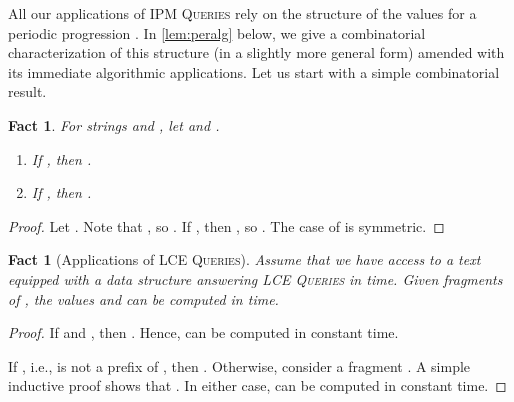 \documentclass[a4paper]{article}
\newtheorem{fact}[theorem]{Fact}
\theoremstyle{definition}
\theoremstyle{remark}
\newcommand{\IPM}{\textsc{IPM Queries}\xspace}
\newcommand{\LCEQ}{\textsc{LCE Queries}\xspace}
\begin{document}
All our applications of \IPM rely on the structure of the values  for a periodic progression .
In \cref{lem:peralg} below, we give a combinatorial characterization of this structure (in a slightly more general form) amended with its immediate algorithmic applications.
Let us start with a simple combinatorial result.
\begin{fact}\label{fct:lcp}
For strings  and , let  and .
\begin{enumerate}[label=(\alph*)]
  \item If , then .
  \item If , then .
\end{enumerate}
\end{fact}
\begin{proof}
Let . Note that , so .
If , then , so . The case of  is symmetric.
\end{proof}

\begin{fact}[Applications of \LCEQ]\label{fct:lce}
Assume that we have access to a text  equipped with a data structure answering \LCEQ in  time.
Given fragments  of , the values  and 
can be computed in  time.
\end{fact}
\begin{proof}
If  and ,
then .
Hence,  can be computed in constant time.

If , i.e.,  is not a prefix of , then .
Otherwise, consider a fragment . A simple inductive proof shows that 
.
In either case,  can be computed in constant time.
\end{proof}
\end{document}
